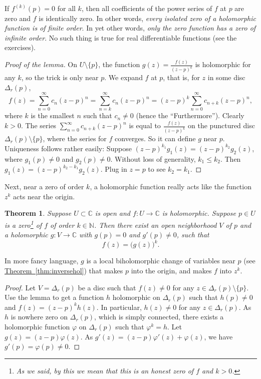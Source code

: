 \documentclass[12pt,openany]{book}
\newcommand{\C}{{\mathbb{C}}}
\newcommand{\N}{{\mathbb{N}}}
\newcommand{\myquote}[1]{``#1''}
\theoremstyle{plain}
\newtheorem{thm}{Theorem}[section]
\theoremstyle{remark}
\theoremstyle{definition}
\theoremstyle{exercise}
\theoremstyle{example}
\newcommand{\thmref}[1]{\hyperref[#1]{Theorem~\ref*{#1}}}
\begin{document}
If $f^{(k)}(p) = 0$
for all $k$, then all coefficients of the power series of $f$ at $p$ are
zero and $f$ is identically zero.  In other words, \emph{every isolated
zero of a holomorphic function is of finite order}.
In yet other words, \emph{only the zero function has a zero of infinite order}.
No such thing is true for real differentiable functions (see the exercises).

\begin{proof}[Proof of the lemma]
On $U \setminus \{ p \}$, the function $g(z) = \frac{f(z)}{{(z-p)}^k}$ is
holomorphic for any $k$, so the trick is only near $p$.  We expand $f$ at
$p$,
that is, for $z$ in some disc $\Delta_r(p)$,
\begin{equation*}
f(z) =
\sum_{n=0}^\infty c_n {(z-p)}^n =
\sum_{n=k}^\infty c_n {(z-p)}^n 
= {(z-p)}^k
\sum_{n=0}^\infty c_{n+k} {(z-p)}^{n} ,
\end{equation*}
where $k$ is the smallest $n$ such that $c_n \neq 0$
(hence the \myquote{Furthermore}).
Clearly $k > 0$.
The series $\sum_{n=0}^\infty c_{n+k}{(z-p)}^n$
is equal to $\frac{f(z)}{{(z-p)}^k}$ on
the punctured disc $\Delta_r(p)\setminus \{ p \}$, where the series
for $f$ converges.
So it can define $g$ near $p$.  Uniqueness follows rather easily:
Suppose ${(z-p)}^{k_1} g_1(z) = {(z-p)}^{k_2} g_2(z)$, where
$g_1(p) \neq 0$ and $g_2(p) \neq 0$.
Without loss of generality,
$k_1 \leq k_2$.
Then 
$g_1(z) = {(z-p)}^{k_2-k_1} g_2(z)$.  Plug in $z=p$ to see $k_2 =
k_1$.
\end{proof}

Next, near a zero of order $k$, a holomorphic function really acts like the
function $z^k$ acts near the origin.

\begin{thm}
Suppose $U \subset \C$ is open and $f \colon U \to \C$ is holomorphic.
Suppose $p \in U$ is a zero\footnote{As we said, by this we mean that
this is an honest zero of $f$ and $k > 0$.}
of $f$ of order $k \in \N$.  Then there exist an open neighborhood $V$
of $p$ and a holomorphic $g \colon V \to \C$ with
$g(p) = 0$ and $g'(p) \neq 0$,
such that
\begin{equation*}
f(z) = {\bigl( g(z) \bigr)}^k.
\end{equation*}
\end{thm}

In more fancy language, $g$ is a local biholomorphic change of variables near
$p$ (see \thmref{thm:inversehol})
that makes $p$ into the origin, and makes $f$ into $z^k$.

\begin{proof}
Let $V = \Delta_r(p)$ be a disc such that $f(z) \neq 0$ for any $z \in
\Delta_r(p) \setminus \{ p \}$.  Use the lemma to get a function $h$ holomorphic
on $\Delta_r(p)$ such that $h(p) \neq 0$ and $f(z) = {(z-p)}^k h(z)$.  In particular,
$h(z) \neq 0$ for any $z \in \Delta_r(p)$.
As $h$ is nowhere zero on $\Delta_r(p)$, which is simply connected,
there exists a holomorphic function $\varphi$ on $\Delta_r(p)$ such that
$\varphi^k = h$.  Let $g(z) = (z-p)\varphi(z)$.  As
$g'(z) = (z-p) \varphi'(z) + \varphi(z)$, we have $g'(p) = \varphi(p) \neq 0$.
\end{proof}
\end{document}
